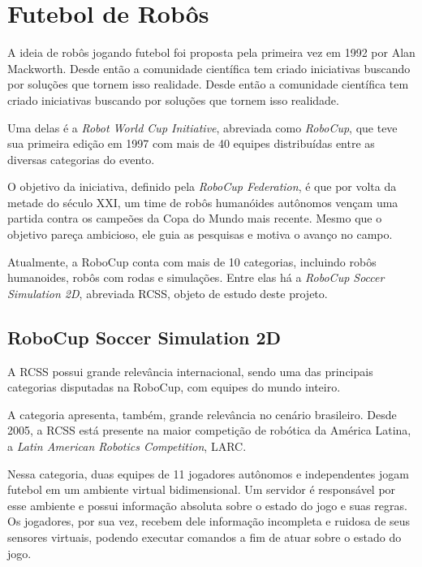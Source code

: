 \section{Futebol de Robôs}
\par A ideia de robôs jogando futebol foi proposta pela primeira vez em 1992 por Alan Mackworth\cite{mackworth1993seeing}. Desde então a comunidade científica tem criado iniciativas buscando por soluções que tornem isso realidade. Desde então a comunidade científica tem criado iniciativas buscando por soluções que tornem isso realidade.
\par Uma delas é a \textit{Robot World Cup Initiative}, abreviada como \textit{RoboCup}, que teve sua primeira edição em 1997 com mais de 40 equipes distribuídas entre as diversas categorias do evento.
\par O objetivo da iniciativa, definido pela \textit{RoboCup Federation}, é que por volta da metade do século XXI, um time de robôs humanóides autônomos vençam uma partida contra os campeões da Copa do Mundo mais recente. Mesmo que o objetivo pareça ambicioso, ele guia as pesquisas e motiva o avanço no campo.
\par Atualmente, a RoboCup conta com mais de 10 categorias, incluindo robôs humanoides, robôs com rodas e simulações. Entre elas há a \textit{RoboCup Soccer Simulation 2D}, abreviada RCSS, objeto de estudo deste projeto.

\subsection{RoboCup Soccer Simulation 2D}
\par A RCSS possui grande relevância internacional, sendo uma das principais categorias disputadas na RoboCup, com equipes do mundo inteiro.
\par A categoria apresenta, também, grande relevância no cenário brasileiro.
Desde 2005, a RCSS está presente na maior competição de robótica da América Latina, a \textit{Latin American Robotics Competition}, LARC.
\par Nessa categoria, duas equipes de 11 jogadores autônomos e independentes jogam futebol em um ambiente virtual bidimensional. Um servidor é responsável por esse ambiente e possui informação absoluta sobre o estado do jogo e suas regras. Os jogadores, por sua vez, recebem dele informação incompleta e ruidosa de seus sensores virtuais, podendo executar comandos a fim de atuar sobre o estado do jogo. \cite{rcssmanual2003}

